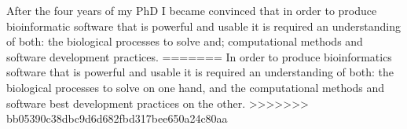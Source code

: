 After the four years of my PhD I became convinced that in order to produce bioinformatic software that is powerful and usable it is required an understanding of both: the biological processes to solve and; computational methods and software development practices.
=======
In order to produce bioinformatics software that is powerful and usable it is required an understanding of both: the biological processes to solve on one hand, and the computational methods and software best development practices on the other.
>>>>>>> bb05390c38dbc9d6d682fbd317bee650a24c80aa
